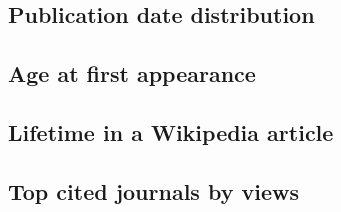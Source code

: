 \subsection{Publication date distribution}

\subsection{Age at first appearance}

\subsection{Lifetime in a Wikipedia article}

\subsection{Top cited journals by views}
